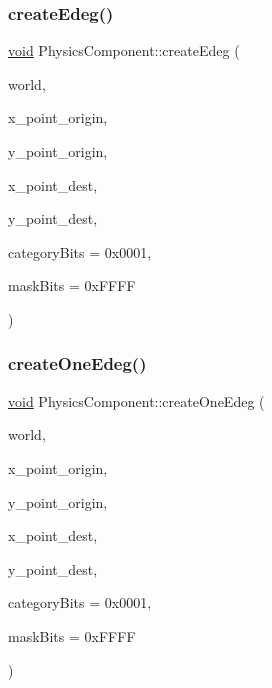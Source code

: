 \mbox{\label{classPhysicsComponent_a1e3f0387d8beec67cd139c093b3d6548}} 
\subsubsection{\texorpdfstring{create\+Edeg()}{createEdeg()}}
{\footnotesize\ttfamily \hyperlink{imgui__impl__opengl3__loader_8h_ac668e7cffd9e2e9cfee428b9b2f34fa7}{void} Physics\+Component\+::create\+Edeg (\begin{DoxyParamCaption}\item[{b2\+World $\ast$}]{world,  }\item[{float}]{x\+\_\+point\+\_\+origin,  }\item[{float}]{y\+\_\+point\+\_\+origin,  }\item[{float}]{x\+\_\+point\+\_\+dest,  }\item[{float}]{y\+\_\+point\+\_\+dest,  }\item[{uint16}]{category\+Bits = {\ttfamily 0x0001},  }\item[{uint16}]{mask\+Bits = {\ttfamily 0xFFFF} }\end{DoxyParamCaption})}

\mbox{\label{classPhysicsComponent_a425b028e07ebe6629a5773658a75348a}} 
\subsubsection{\texorpdfstring{create\+One\+Edeg()}{createOneEdeg()}}
{\footnotesize\ttfamily \hyperlink{imgui__impl__opengl3__loader_8h_ac668e7cffd9e2e9cfee428b9b2f34fa7}{void} Physics\+Component\+::create\+One\+Edeg (\begin{DoxyParamCaption}\item[{b2\+World $\ast$}]{world,  }\item[{float}]{x\+\_\+point\+\_\+origin,  }\item[{float}]{y\+\_\+point\+\_\+origin,  }\item[{float}]{x\+\_\+point\+\_\+dest,  }\item[{float}]{y\+\_\+point\+\_\+dest,  }\item[{uint16}]{category\+Bits = {\ttfamily 0x0001},  }\item[{uint16}]{mask\+Bits = {\ttfamily 0xFFFF} }\end{DoxyParamCaption})}

